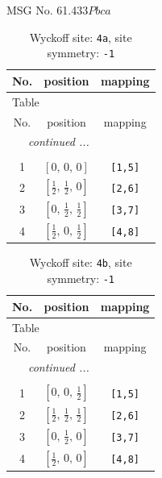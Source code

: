 \documentclass[fleqn,8pt]{jsarticle}
\begin{document}
\setcounter{MaxMatrixCols}{32}

\renewcommand{\tablename}{Table~}
\renewcommand{\figurename}{Figure~}
\begin{center}
\LARGE
MSG No. 61.433\quad$Pbca$
\end{center}
\renewcommand{\arraystretch}{1.2}
\begin{longtable}{ccc}
\caption{Wyckoff site: {\tt 4a}, site symmetry: {\tt -1}}
 \\
 \hline \hline
No. & position & mapping \\ \hline \endfirsthead

\multicolumn{2}{l}{\tablename\ \thetable{}} \\
 \hline \hline
No. & position & mapping \\ \hline \endhead

 \hline \hline
\multicolumn{2}{r}{\footnotesize\it continued ...} \\ \endfoot

 \hline \hline
\multicolumn{2}{r}{} \\ \endlastfoot

1 & $\left[ 0,\, 0,\, 0 \right]$ & {\tt [1,5]} \\ \hline
2 & $\left[ \frac{1}{2},\, \frac{1}{2},\, 0 \right]$ & {\tt [2,6]} \\ \hline
3 & $\left[ 0,\, \frac{1}{2},\, \frac{1}{2} \right]$ & {\tt [3,7]} \\ \hline
4 & $\left[ \frac{1}{2},\, 0,\, \frac{1}{2} \right]$ & {\tt [4,8]} \\
\end{longtable}
\renewcommand{\arraystretch}{1.2}
\begin{longtable}{ccc}
\caption{Wyckoff site: {\tt 4b}, site symmetry: {\tt -1}}
 \\
 \hline \hline
No. & position & mapping \\ \hline \endfirsthead

\multicolumn{2}{l}{\tablename\ \thetable{}} \\
 \hline \hline
No. & position & mapping \\ \hline \endhead

 \hline \hline
\multicolumn{2}{r}{\footnotesize\it continued ...} \\ \endfoot

 \hline \hline
\multicolumn{2}{r}{} \\ \endlastfoot

1 & $\left[ 0,\, 0,\, \frac{1}{2} \right]$ & {\tt [1,5]} \\ \hline
2 & $\left[ \frac{1}{2},\, \frac{1}{2},\, \frac{1}{2} \right]$ & {\tt [2,6]} \\ \hline
3 & $\left[ 0,\, \frac{1}{2},\, 0 \right]$ & {\tt [3,7]} \\ \hline
4 & $\left[ \frac{1}{2},\, 0,\, 0 \right]$ & {\tt [4,8]} \\
\end{longtable}
\end{document}
